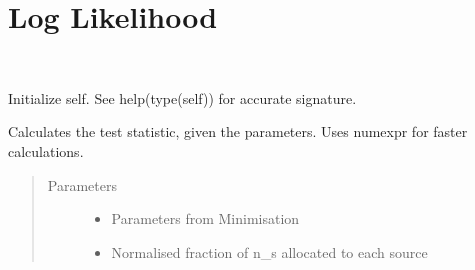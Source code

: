 \documentclass[letterpaper,10pt,english]{sphinxmanual}
\begin{document}
\section{Log Likelihood}
\label{\detokenize{index:module-flarestack.core.llh}}\label{\detokenize{index:log-likelihood}}

\begin{fulllineitems}
\label{\detokenize{index:flarestack.core.llh.FixedEnergyLLH}}~

\begin{fulllineitems}
\label{\detokenize{index:flarestack.core.llh.FixedEnergyLLH.__init__}}
Initialize self.  See help(type(self)) for accurate signature.

\end{fulllineitems}


\begin{fulllineitems}
\label{\detokenize{index:flarestack.core.llh.FixedEnergyLLH.calculate_test_statistic}}
Calculates the test statistic, given the parameters. Uses numexpr
for faster calculations.
\begin{quote}\begin{description}
\item[{Parameters}] \leavevmode\begin{itemize}
\item {} 
 \textendash{} Parameters from Minimisation

\item {} 
 \textendash{} Normalised fraction of n\_s allocated to each source


\end{itemize}
\end{description}
\end{quote}
\end{fulllineitems}
\end{fulllineitems}
\end{document}
